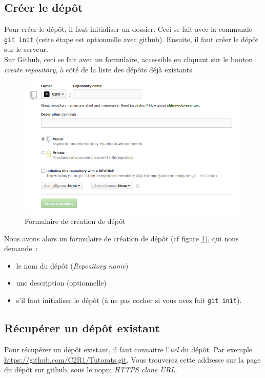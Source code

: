 \documentclass[a4paper,10pt]{report}
\begin{document}
    \subsection{Cr\'eer le d\'ep\^ot}
Pour cr\'eer le d\'ep\^ot, il faut initialiser un dossier. Ceci se fait avec la commande \verb|git init| (cette \'etape est optionnelle avec github). Ensuite, il faut cr\'eer le d\'ep\^ot sur le serveur.\\
Sur Github, ceci se fait avec un formulaire, accessible en cliquant sur le bouton \emph{create repository}, \`a c\^ot\'e de la liste des d\'ep\^ots d\'ej\`a existants.\\
\begin{figure}[h!]
  \begin{center}
    \includegraphics[scale=0.3]{images/createRepoForm}
    \caption{Formulaire de cr\'eation de d\'ep\^ot}
    \label{creationRepo}
  \end{center}
\end{figure}

Nous avons alors un formulaire de cr\'eation de d\'ep\^ot (cf figure \ref{creationRepo}), qui nous demande~:
\begin{itemize}
 \item le nom du d\'ep\^ot (\emph{Repository name})\\
 \item une description (optionnelle)\\
 \item s'il faut initialiser le d\'ep\^ot (\`a ne pas cocher si vous avez fait \verb|git init|).
\end{itemize}

    \subsection{R\'ecup\'erer un d\'ep\^ot existant}
Pour r\'ecup\'erer un d\'ep\^ot existant, il faut connaitre l'\emph{url} du d\'ep\^ot. Par exemple \url{https://github.com/C2R1/Tutorats.git}. Vous trouverez cette addresse sur la page du d\'ep\^ot sur github, sous le nopm \emph{HTTPS clone URL}.\\
\end{document}
